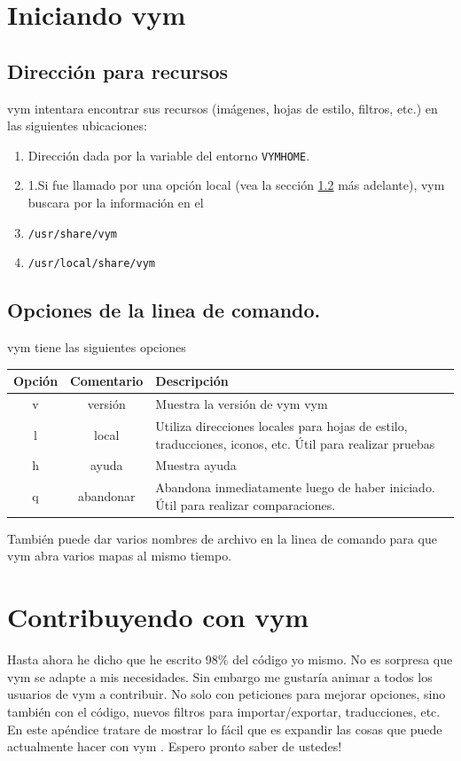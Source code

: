 \documentclass{article}
\newcommand{\vym}{{\sc vym }}
\begin{document}
\begin{appendix}

\section{Iniciando \vym}
\subsection{Direcci\'on para recursos}
\vym intentara encontrar sus recursos (im\'agenes, hojas de estilo, filtros, etc.) en las siguientes ubicaciones:
\begin{enumerate}
    \item Direcci\'on dada por la variable del entorno {\tt VYMHOME}.
    \item 1.Si fue llamado por una opci\'on local (vea la secci\'on \ref{options} m\'as adelante), \vym buscara por la informaci\'on en el 
    \item {\tt /usr/share/vym}
    \item {\tt /usr/local/share/vym}
\end{enumerate}

\subsection{Opciones de la linea de comando.} \label{options}
\vym tiene las siguientes opciones
\begin{center}
\begin{tabular}{ccp{8cm}}\\ 
\bf Opci\'on    & \bf Comentario & \bf Descripci\'on \\ \hline
v & versi\'on & Muestra la versi\'on de \vym \vym\\
l & local   & Utiliza direcciones locales para hojas de estilo, traducciones, iconos, etc. \'Util para realizar pruebas\\
h & ayuda   & Muestra ayuda\\
q & abandonar   & Abandona inmediatamente luego de haber iniciado. \'Util para realizar comparaciones.\\
\end{tabular}
\end{center}
Tambi\'en puede dar varios nombres de archivo en la linea de comando para que \vym abra varios mapas al mismo tiempo.
 
\section{Contribuyendo con \vym}
Hasta ahora he dicho que he escrito 98\% del c\'odigo yo mismo. No es sorpresa que \vym se adapte a mis necesidades. Sin embargo me gustar\'ia animar a todos los usuarios de \vym a contribuir. No solo con peticiones para mejorar opciones, sino tambi\'en con el c\'odigo, nuevos filtros para importar/exportar, traducciones, etc. En este ap\'endice tratare de mostrar lo f\'acil que es expandir las cosas que puede actualmente hacer con \vym. Espero pronto saber de ustedes!


\end{appendix}
\end{document}
